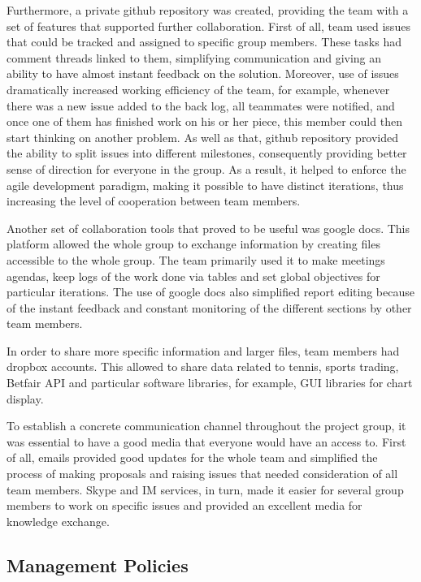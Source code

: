\documentclass[10pt]{article}
\begin{document}
Furthermore, a private github repository was created, providing the team with a set of features that supported further collaboration. First of all, team used issues that could be tracked and assigned to specific group members. These tasks had comment threads linked to them, simplifying communication and giving an ability to have almost instant feedback on the solution. Moreover, use of issues dramatically increased working efficiency of the team, for example, whenever there was a new issue added to the back log, all teammates were notified, and once one of them has finished work on his or her piece, this member could then start thinking on another problem. As well as that, github repository provided the ability to split issues into different milestones, consequently providing better sense of direction for everyone in the group. As a result, it helped to enforce the agile development paradigm, making it possible to have distinct iterations, thus increasing the level of cooperation between team members.

Another set of collaboration tools that proved to be useful was google docs. This platform allowed the whole group to exchange information by creating files accessible to the whole group. The team primarily used it to make meetings agendas, keep logs of the work done via tables and set global objectives for particular iterations. The use of google docs also simplified report editing because of the instant feedback and constant monitoring of the different sections by other team members.

In order to share more specific information and larger files, team members had dropbox accounts. This allowed to share data related to tennis, sports trading, Betfair API and particular software libraries, for example, GUI libraries for chart display.

To establish a concrete communication channel throughout the project group, it was essential to have a good media that everyone would have an access to. First of all, emails provided good updates for the whole team and simplified the process of making proposals and raising issues that needed consideration of all team members. Skype and IM services, in turn, made it easier for several group members to work on specific issues and provided an excellent media for knowledge exchange.

\subsection{Management Policies}
\end{document}
